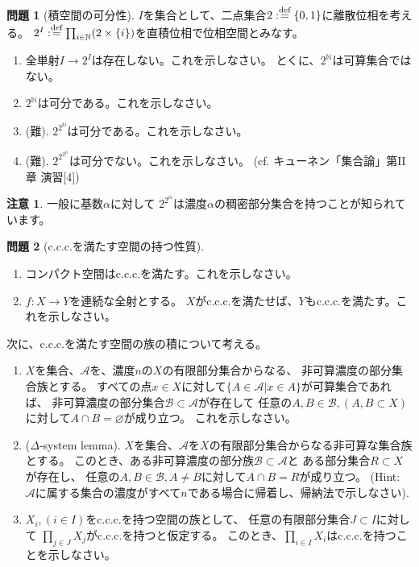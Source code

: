 \documentclass[uplatex]{jsarticle}
\theoremstyle{definition}
\newtheorem{prob}[prob]{問題}
\newtheorem*{rem*}{注意}
\renewcommand{\emptyset}{\varnothing}
\newcommand{\dfn}{:\overset{\mbox{{\scriptsize def}}}{=}}
\newcommand{\N}{\mathbb{N}}
\newcommand{\mcA}{\mathcal{A}}
\newcommand{\mcB}{\mathcal{B}}
\begin{document}
\begin{prob}[積空間の可分性]\label{power separable}
  \(I\)を集合として、二点集合\(2\dfn \{0,1\}\)に離散位相を考える。
  \(2^I\dfn \prod_{i\in \N}(2\times \{i\})\)を直積位相で位相空間とみなす。
  \begin{enumerate}
    \item
    全単射\(I\to 2^I\)は存在しない。これを示しなさい。
    とくに、\(2^{\N}\)は可算集合ではない。
    \item
    \(2^{\N}\)は可分である。これを示しなさい。
    \item (難).
    \(2^{2^{\N}}\)は可分である。これを示しなさい。
    \item (難).
    \(2^{2^{2^{\N}}}\)は可分でない。これを示しなさい。
    (cf. キューネン「集合論」第II章 演習[4])
  \end{enumerate}
\end{prob}



\begin{rem*}
  一般に基数\(\alpha\)に対して
  \(2^{2^{\alpha}}\)は濃度\(\alpha\)の稠密部分集合を持つことが知られています。
\end{rem*}



\begin{prob}[c.c.c.を満たす空間の持つ性質]\label{prod c.c.c.}
  \
  \begin{enumerate}
    \item
    コンパクト空間はc.c.c.を満たす。これを示しなさい。
    \item \(f:X\to Y\)を連続な全射とする。
    \(X\)がc.c.c.を満たせば、\(Y\)もc.c.c.を満たす。これを示しなさい。
  \end{enumerate}
  次に、c.c.c.を満たす空間の族の積について考える。
  \begin{enumerate}
    \item
    \(X\)を集合、\(\mcA\)を、濃度\(n\)の\(X\)の有限部分集合からなる、
    非可算濃度の部分集合族とする。
    すべての点\(x\in X\)に対して\(\{A\in \mcA | x\in A\}\)が可算集合であれば、
    非可算濃度の部分集合\(\mcB\subset \mcA\)が存在して
    任意の\(A,B\in \mcB, (A,B\subset X)\)に対して\(A\cap B = \emptyset\)が成り立つ。
    これを示しなさい。
    \item (\(\Delta\)-system lemma).
    \(X\)を集合、\(\mcA\)を\(X\)の有限部分集合からなる非可算な集合族とする。
    このとき、ある非可算濃度の部分族\(\mcB\subset \mcA\)と
    ある部分集合\(R\subset X\)が存在し、
    任意の\(A,B\in \mcB, A\neq B\)に対して\(A\cap B = R\)が成り立つ。
    (Hint: \(\mcA\)に属する集合の濃度がすべて\(n\)である場合に帰着し、帰納法で示しなさい).
    \item
    \(X_i, (i\in I)\)をc.c.c.を持つ空間の族として、
    任意の有限部分集合\(J\subset I\)に対して
    \(\prod_{j\in J}X_j\)がc.c.c.を持つと仮定する。
    このとき、\(\prod_{i\in I}X_i\)はc.c.c.を持つことを示しなさい。
  \end{enumerate}
\end{prob}
\end{document}
